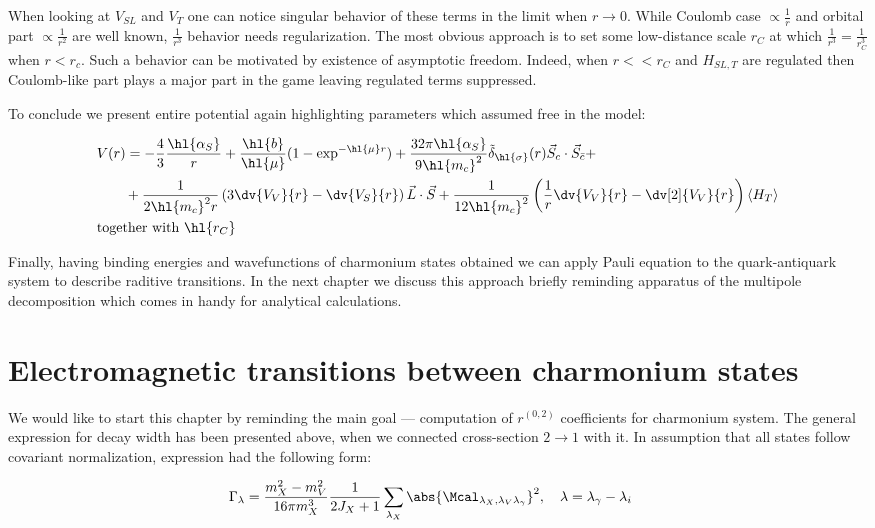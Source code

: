 When looking at $V_{SL}$ and $V_T$ one can notice singular behavior of these terms in the limit when $r \rightarrow 0$. While Coulomb case $\propto \frac{1}{r}$ and orbital part $\propto \frac{1}{r^2}$ are well known, $\frac{1}{r^3}$ behavior needs regularization. The most obvious approach is to set some low-distance scale $r_C$ at which $\frac{1}{r^3} = \frac{1}{r_C^3}$ when $r < r_c$. Such a behavior can be motivated by existence of asymptotic freedom. Indeed, when $r << r_C$ and $H_{SL, T}$ are regulated then Coulomb-like part plays a major part in the game leaving regulated terms suppressed.

To conclude we present entire potential again highlighting parameters which assumed free in the model:

\begin{align}
    &V(r) = -\frac{4}{3} \frac{\hl{\alpha_S}}{r} + \frac{\hl{b}}{\hl{\mu}} (1 - \exp^{-\hl{\mu} r}) + \frac{32 \pi \hl{\alpha_S}}{9 \hl{m_c}^2} \tilde{\delta}_{\hl{\sigma}}(r) \vec{S}_c \cdot \vec{S}_{\bar{c}} + \nonumber \\
    &\qquad+ \frac{1}{2 \hl{m_c}^2 r} \left( 3 \dv{V_V}{r} - \dv{V_S}{r} \right) \vec{L} \cdot \vec{S} + \frac{1}{12 \hl{m_c}^2} \left( \frac{1}{r} \dv{V_V}{r} - \dv[2]{V_V}{r} \right) \left<H_T\right> \nonumber \\
    &\text{together with}~\hl{r_C}
\end{align}

Finally, having binding energies and wavefunctions of charmonium states obtained we can apply Pauli equation to the quark-antiquark system to describe raditive transitions. In the next chapter we discuss this approach briefly reminding apparatus of the multipole decomposition which comes in handy for analytical calculations.

\section{Electromagnetic transitions between charmonium states}
We would like to start this chapter by reminding the main goal --- computation of $r^{(0,2)}$ coefficients for charmonium system. The general expression for decay width has been presented above, when we connected cross-section $2 \rightarrow 1$ with it. In assumption that all states follow covariant normalization, expression had the following form:

\begin{align}
    &\Gamma_{\lambda} = \frac{m_X^2 - m_V^2}{16 \pi m_X^3} \frac{1}{2J_X + 1} \sum_{\lambda_X} \abs{\Mcal_{\lambda_X, \lambda_V \lambda_\gamma}}^2, \quad \lambda = \lambda_\gamma - \lambda_i
\end{align}

